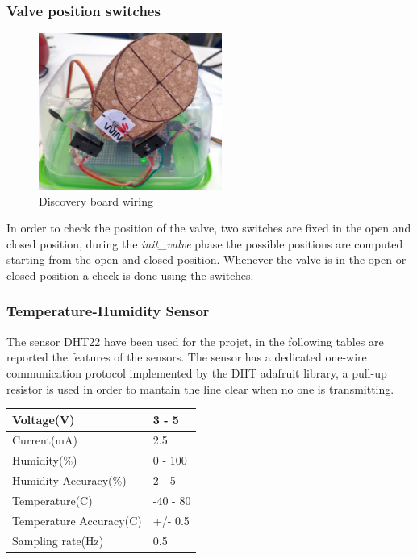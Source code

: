 \subsubsection{Valve position switches}
\begin{figure}[h]
	\centering
	\includegraphics[width=6cm,keepaspectratio]{img/valve}
	\caption{Discovery board wiring}
	\label{fig:valve}
\end{figure}
In order to check the position of the valve, two switches are fixed in the open and closed position, during the \textit{init\_valve} phase the possible positions are computed starting from the open and closed position.
Whenever the valve is in the open or closed position a check is done using the switches.

\subsubsection{Temperature-Humidity Sensor}
The sensor DHT22 have been used for the projet, in the following tables are reported the features of the sensors.
The sensor has a dedicated one-wire communication protocol implemented by the DHT adafruit library, a pull-up resistor is used in order to mantain the line clear when no one is transmitting.

\begin{center}
	\begin{tabular}{||l | l||} 
		\hline
		Voltage(V) & 3 - 5 \\ 
		\hline
		Current(mA) & 2.5 \\
		\hline
		Humidity(\%) & 0 - 100 \\
		\hline
		Humidity Accuracy(\%) & 2 - 5 \\
		\hline
		Temperature(C\degree) & -40 - 80 \\
		\hline
		Temperature Accuracy(C\degree) & +/- 0.5 \\
		\hline
		Sampling rate(Hz) & 0.5 \\
		\hline
	\end{tabular}
\end{center}


